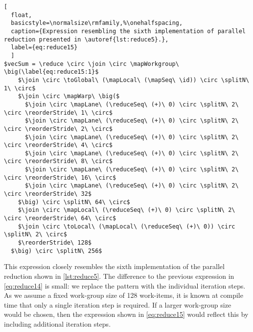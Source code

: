 \begin{lstlisting}[
  float,
  basicstyle=\normalsize\rmfamily,%\onehalfspacing,
  caption={Expression resembling the sixth implementation of parallel reduction presented in \autoref{lst:reduce5}.},
  label={eq:reduce15}
  ]
$vecSum = \reduce \circ \join \circ \mapWorkgroup\ \big(\label{eq:reduce15:1}$
    $\join \circ \toGlobal\ (\mapLocal\ (\mapSeq\ \id)) \circ \splitN\ 1\ \circ$
    $\join \circ \mapWarp\ \big($
      $\join \circ \mapLane\ (\reduceSeq\ (+)\ 0) \circ \splitN\ 2\ \circ \reorderStride\ 1\ \circ$
      $\join \circ \mapLane\ (\reduceSeq\ (+)\ 0) \circ \splitN\ 2\ \circ \reorderStride\ 2\ \circ$
      $\join \circ \mapLane\ (\reduceSeq\ (+)\ 0) \circ \splitN\ 2\ \circ \reorderStride\ 4\ \circ$
      $\join \circ \mapLane\ (\reduceSeq\ (+)\ 0) \circ \splitN\ 2\ \circ \reorderStride\ 8\ \circ$
      $\join \circ \mapLane\ (\reduceSeq\ (+)\ 0) \circ \splitN\ 2\ \circ \reorderStride\ 16\ \circ$
      $\join \circ \mapLane\ (\reduceSeq\ (+)\ 0) \circ \splitN\ 2\ \circ \reorderStride\ 32$
    $\big) \circ \splitN\ 64\ \circ$
    $\join \circ \mapLocal\ (\reduceSeq\ (+)\ 0) \circ \splitN\ 2\ \circ \reorderStride\ 64\ \circ$
    $\join \circ \toLocal\ (\mapLocal\ (\reduceSeq\ (+)\ 0)) \circ \splitN\ 2\ \circ$
    $\reorderStride\ 128$
  $\big) \circ \splitN\ 256$
\end{lstlisting}
%
This expression closely resembles the sixth implementation of the parallel reduction shown in \autoref{lst:reduce5}.
The difference to the previous expression in \autoref{eq:reduce14} is small:
we replace the \iterateN pattern with the individual iteration steps.
As we assume a fixed work-group size of 128 work-items, it is known at compile time that only a single iteration step is required.
If a larger work-group size would be chosen, then the expression shown in \autoref{eq:reduce15} would reflect this by including additional iteration steps.




